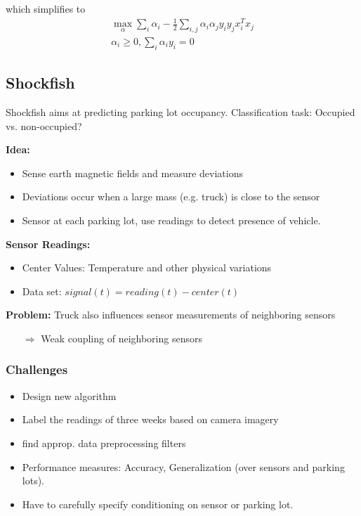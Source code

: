 which simplifies to
\begin{equation*}
	\begin{gathered}
		\max_\alpha \sum_i \alpha_i-\frac{1}{2}\sum_{i,j} \alpha_i\alpha_jy_iy_jx_i^Tx_j\\
		\alpha_i\geq 0, \sum_i\alpha_i y_i = 0
	\end{gathered}
\end{equation*}

\subsection{Shockfish}
Shockfish aims at predicting parking lot occupancy. Classification task: Occupied vs. non-occupied?

\textbf{Idea:}
\begin{itemize}
	\item Sense earth magnetic fields and measure deviations
	\item Deviations occur when a large mass (e.g. truck) is close to the sensor
	\item Sensor at each parking lot, use readings to detect presence of vehicle.
\end{itemize}

\textbf{Sensor Readings: }
\begin{itemize}
	\item Center Values: Temperature and other physical variations
	\item Data set: $\textit{signal}(t) = \textit{reading}(t) - \textit{center}(t)$
\end{itemize}

\textbf{Problem: }Truck also influences sensor measurements of neighboring sensors
\begin{itemize}
	\item[$\Rightarrow$] Weak coupling of neighboring sensors 
\end{itemize}

\subsubsection{Challenges}
\begin{itemize}
	\item Design new algorithm
	\item Label the readings of three weeks based on camera imagery
	\item find approp. data preprocessing filters
	\item Performance measures: Accuracy, Generalization (over sensors and parking lots).
	\item Have to carefully specify conditioning on sensor or parking lot.
\end{itemize}

